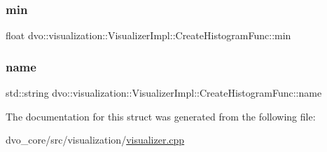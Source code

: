 \subsubsection{\texorpdfstring{min}{min}}
{\footnotesize\ttfamily float dvo\+::visualization\+::\+Visualizer\+Impl\+::\+Create\+Histogram\+Func\+::min}

\mbox{\label{structdvo_1_1visualization_1_1_visualizer_impl_1_1_create_histogram_func_a638ab4faaac71fc668bc6fb5e5c507b1}} 
\subsubsection{\texorpdfstring{name}{name}}
{\footnotesize\ttfamily std\+::string dvo\+::visualization\+::\+Visualizer\+Impl\+::\+Create\+Histogram\+Func\+::name}



The documentation for this struct was generated from the following file\+:\begin{DoxyCompactItemize}
\item 
dvo\+\_\+core/src/visualization/\mbox{\hyperlink{visualizer_8cpp}{visualizer.\+cpp}}\end{DoxyCompactItemize}
